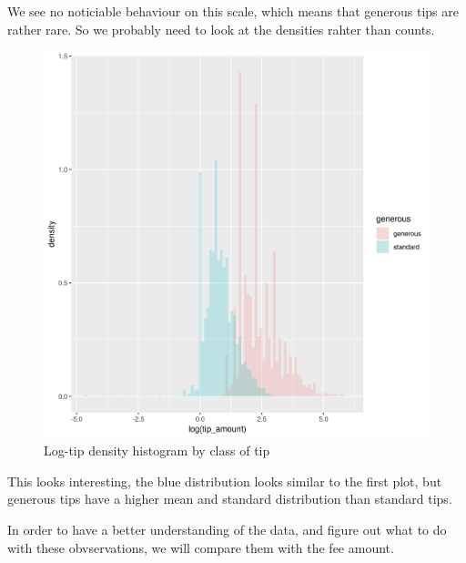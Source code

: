 \documentclass[11pt]{article}
\begin{document}
We see no noticiable behaviour on this scale, which means that generous tips are
rather rare. So we probably need to look at the densities rahter than counts.

\begin{figure}[htbp]
\centering
\includegraphics[width=.9\linewidth]{./plots/logTipGenerousFrequencyHist.jpg}
\caption{\label{fig:org4b3fd62}
Log-tip density histogram by class of tip}
\end{figure}

This looks interesting, the blue distribution looks similar to the first plot,
but generous tips have a higher mean and standard distribution than standard
tips.

In order to have a better understanding of the data, and figure out what to do
with these obvservations, we will compare them with the fee amount.
\end{document}
